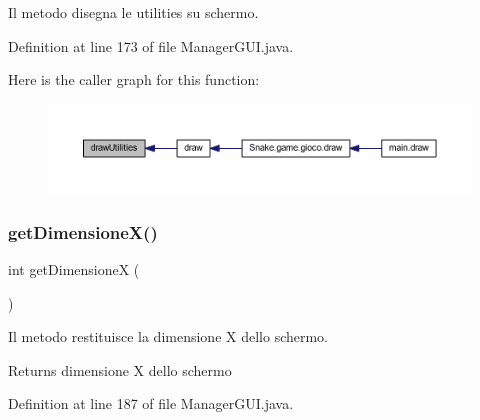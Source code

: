 Il metodo disegna le utilities su schermo. 



Definition at line 173 of file Manager\+G\+U\+I.\+java.

Here is the caller graph for this function\+:
\nopagebreak
\begin{figure}[H]
\begin{center}
\leavevmode
\includegraphics[width=350pt]{class_snake_1_1gui_1_1_manager_g_u_i_ab4847130cdcf549a9cb479df18417787_icgraph}
\end{center}
\end{figure}
\mbox{\label{class_snake_1_1gui_1_1_manager_g_u_i_a9e8362afc9e8ce68cca6528eb57869a2}} 
\subsubsection{\texorpdfstring{get\+Dimensione\+X()}{getDimensioneX()}}
{\footnotesize\ttfamily int get\+DimensioneX (\begin{DoxyParamCaption}{ }\end{DoxyParamCaption})}



Il metodo restituisce la dimensione X dello schermo. 

\begin{DoxyReturn}{Returns}
dimensione X dello schermo 
\end{DoxyReturn}


Definition at line 187 of file Manager\+G\+U\+I.\+java.

